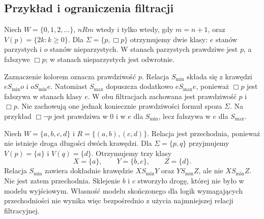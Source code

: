 \subsection{Przykład i ograniczenia filtracji}

\begin{przyklad}
\label{ex:ncl-kripke-filtration-chain}
Niech $W=\{0,1,2,\ldots\}$,
$nRm$ wtedy i tylko wtedy, gdy $m=n+1$,
oraz $V(p)=\{2k:k\geq0\}$.
Dla $\Sigma=\{p,\Box p\}$ otrzymujemy
dwie klasy: $e$ stanów parzystych i $o$
stanów nieparzystych. W stanach parzystych
prawdziwe jest $p$, a fałszywe $\Box p$;
w stanach nieparzystych jest odwrotnie.
\begin{center}
\end{center}
Zaznaczenie kolorem oznacza prawdziwość $p$.
Relacja $S_{\min}$ składa się z krawędzi
$eS_{\min}o$ i $oS_{\min}e$.
Natomiast $S_{\max}$ dopuszcza dodatkowo
$eS_{\max}e$, ponieważ $\Box p$ jest
fałszywa w stanach klasy $e$.
W obu filtracjach zachowana jest prawdziwość
$p$ i $\Box p$. Nie zachowują one jednak
koniecznie prawdziwości formuł spoza $\Sigma$.
Na przykład $\Box\neg p$ jest prawdziwa w $0$
i w $e$ dla $S_{\min}$, lecz fałszywa w $e$
dla $S_{\max}$.
\end{przyklad}

\begin{przyklad}
\label{ex:ncl-kripke-filtration-transitivity-loss}
Niech $W=\{a,b,c,d\}$ i
$R=\{(a,b),(c,d)\}$. Relacja jest przechodnia,
ponieważ nie istnieje droga długości dwóch krawędzi.
Dla $\Sigma=\{p,q\}$ przyjmujemy
$V(p)=\{a\}$ i $V(q)=\{d\}$.
Otrzymujemy trzy klasy
\[
 X=\{a\},\qquad Y=\{b,c\},\qquad Z=\{d\}.
\]
Relacja $S_{\min}$ zawiera dokładnie krawędzie
$XS_{\min}Y$ oraz $YS_{\min}Z$,
ale nie $XS_{\min}Z$. Nie jest zatem przechodnia.
Sklejenie $b$ i $c$ stworzyło drogę,
której nie było w modelu wyjściowym.
Własność modelu skończonego dla logik
wymagających przechodniości nie wynika
więc bezpośrednio z użycia najmniejszej
relacji filtracyjnej.
\end{przyklad}

